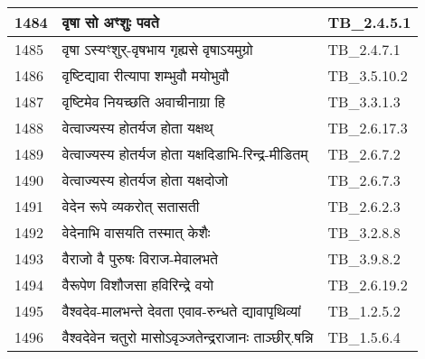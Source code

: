 \documentclass[17pt]{extarticle}
\begin{document}
\begin{longtable}{||p{0.4in}||p{4.9in}||p{0.9in}||}
    1484 & वृषा सो अꣳशुः पवते & TB\_2.4.5.1       \\
    
    \hline
        
    1485 & वृषा ऽस्यꣳशुर्{-}वृषभाय गृह्यसे वृषाऽयमुग्रो & TB\_2.4.7.1       \\
    
    \hline
        
    1486 & वृष्टिद्यावा रीत्यापा शम्भुवौ मयोभुवौ & TB\_3.5.10.2       \\
    
    \hline
        
    1487 & वृष्टिमेव नियच्छति अवाचीनाग्रा हि & TB\_3.3.1.3       \\
    
    \hline
        
    1488 & वेत्वाज्यस्य होतर्यज होता यक्षथ् & TB\_2.6.17.3       \\
    
    \hline
        
    1489 & वेत्वाज्यस्य होतर्यज होता यक्षदिडाभि{-}रिन्द्र{-}मीडितम् & TB\_2.6.7.2       \\
    
    \hline
        
    1490 & वेत्वाज्यस्य होतर्यज होता यक्षदोजो & TB\_2.6.7.3       \\
    
    \hline
        
    1491 & वेदेन रूपे व्यकरोत् सतासती & TB\_2.6.2.3       \\
    
    \hline
        
    1492 & वेदेनाभि वासयति तस्मात् केशैः & TB\_3.2.8.8       \\
    
    \hline
        
    1493 & वैराजो वै पुरुषः विराज{-}मेवालभते & TB\_3.9.8.2       \\
    
    \hline
        
    1494 & वैरूपेण विशौजसा हविरिन्द्रे वयो & TB\_2.6.19.2       \\
    
    \hline
        
    1495 & वैश्वदेव{-}मालभन्ते देवता एवाव{-}रुन्धते द्यावापृथिव्यां & TB\_1.2.5.2       \\
    
    \hline
        
    1496 & वैश्वदेवेन चतुरो मासोऽवृञ्जतेन्द्रराजानः ताञ्छीर्.षन्नि & TB\_1.5.6.4       \\
    

\end{longtable}
\end{document}
